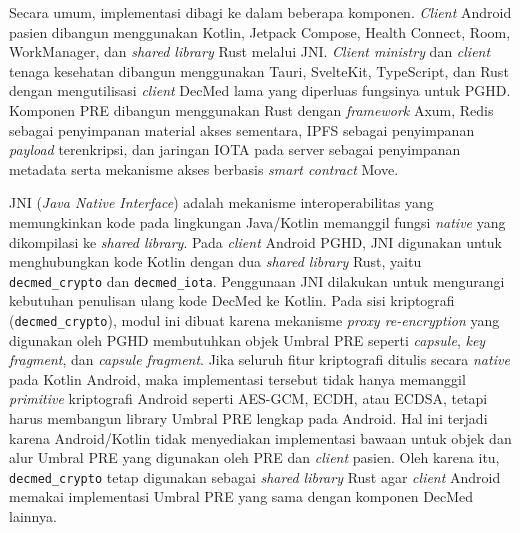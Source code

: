 Secara umum, implementasi dibagi ke dalam beberapa komponen.
\textit{\textit{Client} } Android pasien dibangun menggunakan Kotlin, Jetpack Compose, Health Connect, Room, WorkManager, dan \textit{shared library} Rust melalui JNI\@.
\textit{\textit{Client} ministry} dan \textit{client} tenaga kesehatan dibangun menggunakan Tauri, SvelteKit, TypeScript, dan Rust dengan mengutilisasi \textit{client} DecMed lama yang diperluas fungsinya untuk PGHD\@.
Komponen PRE dibangun menggunakan Rust dengan \textit{framework} Axum, Redis sebagai penyimpanan material akses sementara, IPFS sebagai penyimpanan \textit{payload} terenkripsi, dan jaringan IOTA pada server sebagai penyimpanan metadata serta mekanisme akses berbasis \textit{smart contract} Move.



JNI (\textit{Java Native Interface}) adalah mekanisme interoperabilitas yang memungkinkan kode pada lingkungan Java/Kotlin memanggil fungsi \textit{native} yang dikompilasi ke \textit{shared library}.
Pada \textit{client} Android PGHD, JNI digunakan untuk menghubungkan kode Kotlin dengan dua \textit{shared library} Rust, yaitu \texttt{decmed\_crypto} dan \texttt{decmed\_iota}.
Penggunaan JNI dilakukan untuk mengurangi kebutuhan penulisan ulang kode DecMed ke Kotlin.
Pada sisi kriptografi (\texttt{decmed\_crypto}), modul ini dibuat karena mekanisme \textit{proxy re-encryption} yang digunakan oleh PGHD membutuhkan objek Umbral PRE seperti \textit{capsule}, \textit{key fragment}, dan \textit{capsule fragment}.
Jika seluruh fitur kriptografi ditulis secara \textit{native} pada Kotlin Android, maka implementasi tersebut tidak hanya memanggil \textit{primitive} kriptografi Android seperti AES-GCM, ECDH, atau ECDSA, tetapi harus membangun library Umbral PRE lengkap pada Android.
Hal ini terjadi karena Android/Kotlin tidak menyediakan implementasi bawaan untuk objek dan alur Umbral PRE yang digunakan oleh PRE dan \textit{client} pasien.
Oleh karena itu, \texttt{decmed\_crypto} tetap digunakan sebagai \textit{shared library} Rust agar \textit{client} Android memakai implementasi Umbral PRE yang sama dengan komponen DecMed lainnya.

